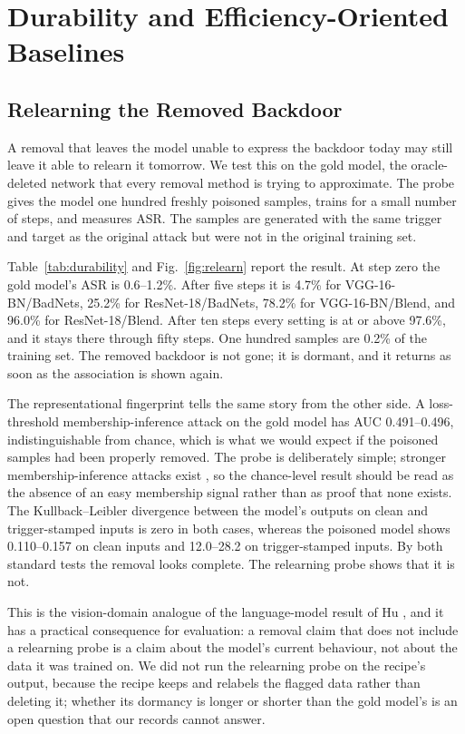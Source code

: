 \section{Durability and Efficiency-Oriented Baselines}
\label{sec:durability}

\subsection{Relearning the Removed Backdoor}
A removal that leaves the model unable to express the backdoor today may still
leave it able to relearn it tomorrow. We test this on the gold model, the
oracle-deleted network that every removal method is trying to approximate. The
probe gives the model one hundred freshly poisoned samples, trains for a small
number of steps, and measures ASR. The samples are generated with the same
trigger and target as the original attack but were not in the original training
set.

Table~\ref{tab:durability} and Fig.~\ref{fig:relearn} report the result. At step
zero the gold model's ASR is 0.6--1.2\%. After five steps it is 4.7\% for
VGG-16-BN/BadNets, 25.2\% for ResNet-18/BadNets, 78.2\% for VGG-16-BN/Blend, and
96.0\% for ResNet-18/Blend. After ten steps every setting is at or above 97.6\%,
and it stays there through fifty steps. One hundred samples are 0.2\% of the
training set. The removed backdoor is not gone; it is dormant, and it returns as
soon as the association is shown again.

The representational fingerprint tells the same story from the other side. A
loss-threshold membership-inference attack on the gold model has AUC
0.491--0.496, indistinguishable from chance, which is what we would expect if the
poisoned samples had been properly removed. The probe is deliberately simple;
stronger membership-inference attacks exist \cite{carlini_mia}, so the
chance-level result should be read as the absence of an easy membership signal
rather than as proof that none exists. The Kullback--Leibler divergence
between the model's outputs on clean and trigger-stamped inputs is zero in both
cases, whereas the poisoned model shows 0.110--0.157 on clean inputs and
12.0--28.2 on trigger-stamped inputs. By both standard tests the removal looks
complete. The relearning probe shows that it is not.

This is the vision-domain analogue of the language-model result of Hu \etal{}
\cite{jogging}, and it has a practical consequence for evaluation: a removal
claim that does not include a relearning probe is a claim about the model's
current behaviour, not about the data it was trained on. We did not run the
relearning probe on the recipe's output, because the recipe keeps and relabels
the flagged data rather than deleting it; whether its dormancy is longer or
shorter than the gold model's is an open question that our records cannot answer.

